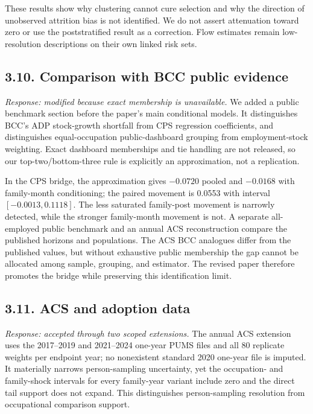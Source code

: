 \documentclass[11pt,letterpaper]{article}
\begin{document}
These results show why clustering cannot cure selection and why the direction of unobserved attrition bias is not identified.  We do not assert attenuation toward zero or use the poststratified result as a correction.  Flow estimates remain low-resolution descriptions on their own linked risk sets.

\subsection*{3.10. Comparison with BCC public evidence}

\emph{Response: modified because exact membership is unavailable.}  We added a public benchmark section before the paper's main conditional models.  It distinguishes BCC's ADP stock-growth shortfall from CPS regression coefficients, and distinguishes equal-occupation public-dashboard grouping from employment-stock weighting.  Exact dashboard memberships and tie handling are not released, so our top-two/bottom-three rule is explicitly an approximation, not a replication.

In the CPS bridge, the approximation gives $-0.0720$ pooled and $-0.0168$ with family-month conditioning; the paired movement is 0.0553 with interval $[-0.0013,0.1118]$.  The less saturated family-post movement is narrowly detected, while the stronger family-month movement is not.  A separate all-employed public benchmark and an annual ACS reconstruction compare the published horizons and populations.  The ACS BCC analogues differ from the published values, but without exhaustive public membership the gap cannot be allocated among sample, grouping, and estimator.  The revised paper therefore promotes the bridge while preserving this identification limit.

\subsection*{3.11. ACS and adoption data}

\emph{Response: accepted through two scoped extensions.}  The annual ACS extension uses the 2017--2019 and 2021--2024 one-year PUMS files and all 80 replicate weights per endpoint year; no nonexistent standard 2020 one-year file is imputed.  It materially narrows person-sampling uncertainty, yet the occupation- and family-shock intervals for every family-year variant include zero and the direct tail support does not expand.  This distinguishes person-sampling resolution from occupational comparison support.
\end{document}

